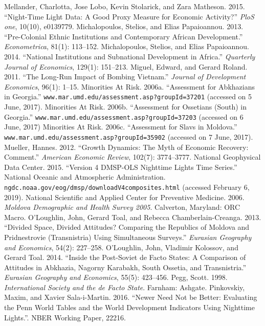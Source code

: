 \documentclass[12pt,a4paper]{article}%
\begin{document}
\begin{thebibliography}{99}
\bibitem{} Mellander, Charlotta, Jose Lobo, Kevin Stolarick, and Zara Matheson. 2015. ``Night-Time Light Data: A Good Proxy Measure for Economic Activity?'' \textit{PloS one}, 10(10), e0139779.
\bibitem{} Michalopoulos, Stelios, and Elias Papaioannou. 2013. ``Pre-Colonial Ethnic Institutions and Contemporary African Development.'' \textit{Econometrica}, 81(1): 113--152.
\bibitem{} Michalopoulos, Stelios, and Elias Papaioannou. 2014. ``National Institutions and Subnational Development in Africa.'' \textit{Quarterly Journal of Economics}, 129(1): 151--213.
\bibitem{} Miguel, Edward, and Gerard Roland. 2011. ``The Long-Run Impact of Bombing Vietnam.'' \textit{Journal of Development Economics}, 96(1): 1--15.
\bibitem{} Minorities At Risk. 2006a. ``Assessment for Abkhazians in Georgia.'' \verb!www.mar.umd.edu/assessment.asp?groupId=37201! (accessed on 5 June, 2017).
\bibitem{} Minorities At Risk. 2006b. ``Assessment for Ossetians (South) in Georgia.'' \verb!www.mar.umd.edu/assessment.asp?groupId=37203!  (accessed on 6 June, 2017)
\bibitem{} Minorities At Risk. 2006c. ``Assessment for Slavs in Moldova.'' \verb!www.mar.umd.edu/assessment.asp?groupId=35902! (accessed on 7 June, 2017).
\bibitem{} Mueller, Hannes. 2012. ``Growth Dynamics: The Myth of Economic Recovery: Comment.'' \textit{American Economic Review}, 102(7): 3774--3777.
\bibitem{} National Geophysical Data Center. 2015. ``Version 4 DMSP-OLS Nighttime Lights Time Series.'' National Oceanic and Atmospheric Administration. \verb!ngdc.noaa.gov/eog/dmsp/downloadV4composites.html! (accessed February 6, 2019).
\bibitem{} National Scientific and Applied Center for Preventive Medicine. 2006. \textit{Moldova Demographic and Health Survey 2005}. Calverton, Maryland: ORC Macro.
\bibitem{} O'Loughlin, John, Gerard Toal, and Rebecca Chamberlain-Creanga. 2013. ``Divided Space, Divided Attitudes? Comparing the Republics of Moldova and Pridnestrovie (Transnistria) Using Simultaneous Surveys.'' \textit{Eurasian Geography and Economics}, 54(2): 227--258.
\bibitem{} O'Loughlin, John, Vladimir Kolossov, and Gerard Toal. 2014. ``Inside the Post-Soviet de Facto States: A Comparison of Attitudes in Abkhazia, Nagorny Karabakh, South Ossetia, and Transnistria.'' \textit{Eurasian Geography and Economics}, 55(5): 423--456.
\bibitem{} Pegg, Scott. 1998. \textit{International Society and the de Facto State}. Farnham: Ashgate.
\bibitem{} Pinkovskiy, Maxim, and Xavier Sala-i-Martin. 2016. ``Newer Need Not be Better: Evaluating the Penn World Tables and the World Development Indicators Using Nighttime Lights.''. NBER Working Paper, 22216.

\end{thebibliography}
\end{document}
